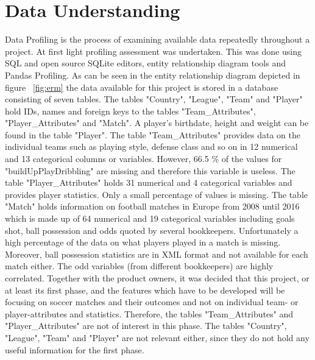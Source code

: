 
\chapter{Data Understanding}
\label{chap:data_understanding}

Data Profiling is the process of examining available data repeatedly throughout a project. At first light profiling assessment was undertaken. This was done using SQL and open source SQLite editors, entity relationship diagram tools and Pandas Profiling. As can be seen in the entity relationship diagram depicted in figure ~\ref{fig:erm} the data available for this project is stored in a database consisting of seven tables.
\newline
The tables "Country", "League", "Team" and "Player" hold IDs, names and foreign keys to the tables "Team\_Attributes", "Player\_Attributes" and "Match". A player's birthdate, height and weight can be found in the table "Player".
\newline
The table "Team\_Attributes" provides data on the individual teams such as playing style, defense class and so on in 12 numerical and 13 categorical columns or variables. However, 66.5 \% of the values for "buildUpPlayDribbling" are missing and therefore this variable is useless.
\newline
The table "Player\_Attributes" holds 31 numerical and 4 categorical variables and provides player statistics. Only a small percentage of values is missing.
\newline
The table "Match" holds information on football matches in Europe from 2008 until 2016 which is made up of 64 numerical and 19 categorical variables including goals shot, ball possession and odds quoted by several bookkeepers. Unfortunately a high percentage of the data on what players played in a match is missing. Moreover, ball possession statistics are in XML format and not available for each match either. The odd variables (from different bookkeepers) are highly correlated.   
\newline
Together with the product owners, it was decided that this project, or at least its first phase, and the features which have to be developed will be focusing on soccer matches and their outcomes and not on individual team- or player-attributes and statistics. Therefore, the tables "Team\_Attributes" and "Player\_Attributes" are not of interest in this phase. The tables "Country", "League", "Team" and "Player" are not relevant either, since they do not hold any useful information for the first phase.


